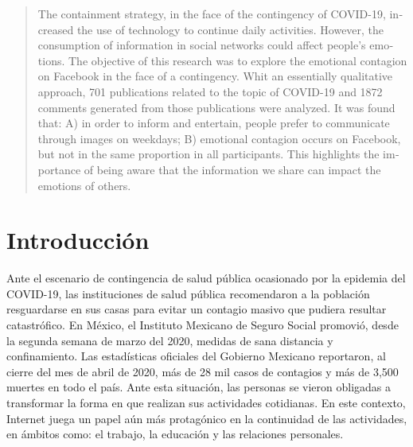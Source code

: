 \documentclass[spanish]{textolivre}
\begin{document}
\begin{polyabstract}
\begin{portuguese}
\begin{abstract}
\end{abstract}
\end{portuguese}

\begin{english}
\begin{abstract}
The containment strategy, in the face of the contingency of COVID-19, 
increased the use of technology to continue daily activities. 
However, the consumption of information in social networks could affect people's
emotions. The objective of this research was to explore the emotional contagion 
on Facebook in the face of a contingency. Whit an essentially qualitative approach,
701 publications related to the topic of COVID-19 and 1872 comments generated from those publications were analyzed. It was found that: A) in order to inform and entertain, people prefer to communicate through images on weekdays; B) emotional contagion occurs on Facebook, but not in the same proportion in all participants. This highlights the importance of being aware that the information we share can impact the emotions of others.

\end{abstract}
\end{english}

\end{polyabstract}


\section{Introducción}\label{sec-introd}
Ante el escenario de contingencia de salud pública ocasionado por la epidemia del COVID-19, las instituciones de salud pública recomendaron a la población resguardarse en sus casas para evitar un contagio masivo que pudiera resultar catastrófico. En México, el Instituto Mexicano de Seguro Social promovió, desde la segunda semana de marzo del 2020, medidas de sana distancia y confinamiento. Las estadísticas oficiales del Gobierno Mexicano reportaron, al cierre del mes de abril de 2020, más de 28 mil casos de contagios y más de 3,500 muertes en todo el país.  Ante esta situación, las personas se vieron obligadas a transformar la forma en que realizan sus actividades cotidianas. En este contexto, Internet juega un papel aún más protagónico en la continuidad de las actividades, en ámbitos como: el trabajo, la educación y las relaciones personales. 
\end{document}
